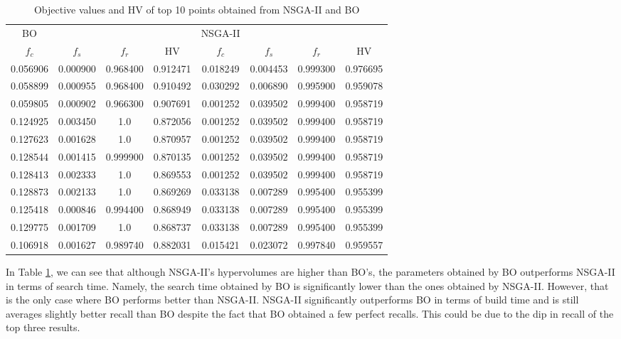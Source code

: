 \begin{table}
    \centering
    \caption{Objective values and HV of top 10 points obtained from NSGA-II and BO}
    \label{tbl:compare-nsga-bo}
    \begin{tabular}{cccc|cccc}
        \toprule
        BO & & & & NSGA-II & \\
        \(f_c\) & \(f_s\) & \(f_r\) & HV & \(f_c\) & \(f_s\) & \(f_r\) & HV \\
        \midrule
        0.056906 & 0.000900 & 0.968400 & 0.912471 & 0.018249 & 0.004453 & 0.999300 & 0.976695 \\
        0.058899 & 0.000955 & 0.968400 & 0.910492 & 0.030292 & 0.006890 & 0.995900 & 0.959078 \\
        0.059805 & 0.000902 & 0.966300 & 0.907691 & 0.001252 & 0.039502 & 0.999400 & 0.958719 \\
        0.124925 & 0.003450 & 1.0 & 0.872056 & 0.001252 & 0.039502 & 0.999400 & 0.958719 \\
        0.127623 & 0.001628 & 1.0 & 0.870957 & 0.001252 & 0.039502 & 0.999400 & 0.958719 \\
        0.128544 & 0.001415 & 0.999900 & 0.870135 & 0.001252 & 0.039502 & 0.999400 & 0.958719 \\
        0.128413 & 0.002333 & 1.0 & 0.869553 & 0.001252 & 0.039502 & 0.999400 & 0.958719 \\
        0.128873 & 0.002133 & 1.0 & 0.869269 & 0.033138 & 0.007289 & 0.995400 & 0.955399 \\
        0.125418 & 0.000846 & 0.994400 & 0.868949 & 0.033138 & 0.007289 & 0.995400 & 0.955399 \\
        0.129775 & 0.001709 & 1.0 & 0.868737 & 0.033138 & 0.007289 & 0.995400 & 0.955399 \\
        \midrule
        0.106918 & 0.001627 & 0.989740 & 0.882031 & 0.015421 & 0.023072 & 0.997840 & 0.959557 \\
        \bottomrule
    \end{tabular}
\end{table}

In Table \ref{tbl:compare-nsga-bo}, we can see that although NSGA-II's hypervolumes are higher than BO's, the parameters obtained by BO outperforms NSGA-II in terms of search time. Namely, the search time obtained by BO is significantly lower than the ones obtained by NSGA-II. However, that is the only case where BO performs better than NSGA-II. NSGA-II significantly outperforms BO in terms of build time and is still averages slightly better recall than BO despite the fact that BO obtained a few perfect recalls. This could be due to the dip in recall of the top three results.

